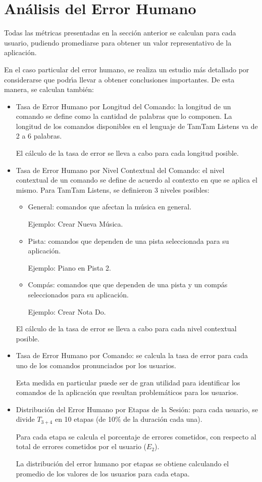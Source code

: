 \section{An\'alisis del Error Humano}
\label{sec:evaluacionError}
Todas las m\'etricas presentadas en la secci\'on anterior se calculan para cada usuario,
pudiendo promediarse para obtener un valor representativo de la aplicaci\'on.

En el caso particular del error humano, se realiza un estudio m\'as detallado
por considerarse que podr{\'\i}a llevar a obtener conclusiones importantes. 
De esta manera, se calculan tambi\'en:

\begin{itemize}
	\item Tasa de Error Humano por Longitud del Comando: la longitud de un comando se define
	como la cantidad de palabras que lo componen. La longitud de los comandos disponibles en el 
	lenguaje de TamTam Listens va de 2 a 6 palabras.

	El c\'alculo de la tasa de error se lleva a cabo para cada longitud posible.  


	\item Tasa de Error Humano por Nivel Contextual del Comando: el nivel contextual de un comando
	se define de acuerdo al contexto en que se aplica el mismo.
	Para TamTam Listens, se definieron 3 niveles posibles:
		\begin{itemize}
			\item General: comandos que afectan la m\'usica en general. 

			Ejemplo: Crear Nueva M\'usica.
			\item Pista: comandos que dependen de una pista seleccionada para su aplicaci\'on. 

			Ejemplo: Piano en Pista 2.
			\item Comp\'as: comandos que que dependen de una pista y un comp\'as seleccionados 
			para su aplicaci\'on. 

			Ejemplo: Crear Nota Do.
		\end{itemize}
	
		
	El c\'alculo de la tasa de error se lleva a cabo para cada nivel contextual posible.

	\item Tasa de Error Humano por Comando: se calcula la tasa de error para cada uno
	de los comandos pronunciados por los usuarios.

	Esta medida en particular puede ser de gran utilidad para identificar los comandos de la
	aplicaci\'on que resultan problem\'aticos para los usuarios.
	
	\item Distribuci\'on del Error Humano por Etapas de la Sesi\'on: para cada usuario, 
	se divide $T_{3+4}$ en 10 etapas (de 10\% de la duraci\'on cada una).

	Para cada etapa se calcula el porcentaje de errores cometidos, con respecto al total de
	errores cometidos por el usuario ($E_2$).

	La distribuci\'on del error humano por etapas se obtiene calculando 
	el promedio de los valores de los usuarios para cada etapa.
   
\end{itemize}